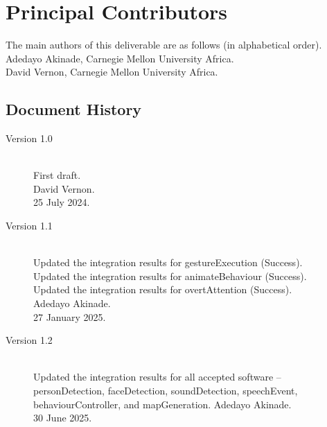 \documentclass{CSSRforAfrica}
\begin{document}
\newpage

%                                 



\pagebreak
\section*{Principal Contributors}
\label{contributors}
The main authors of this deliverable are as follows (in alphabetical order).\\
Adedayo Akinade, Carnegie Mellon University Africa.\\
David Vernon, Carnegie Mellon University Africa.\\     

  

\newpage
\subsection*{Document History}
\label{document_history}

\begin{description}

\item [Version 1.0]~\\
First draft. \\
David Vernon. \\                               
25 July 2024.      

\item [Version 1.1]~\\
Updated the integration results for gestureExecution (Success). \\
Updated the integration results for animateBehaviour (Success). \\
Updated the integration results for overtAttention (Success). \\
Adedayo Akinade. \\                               
27 January 2025.   

\item [Version 1.2]~\\
Updated the integration results for all accepted software -- personDetection, faceDetection, soundDetection, speechEvent, behaviourController, and mapGeneration.
Adedayo Akinade. \\                               
30 June 2025.   


\end{description}
\end{document}
